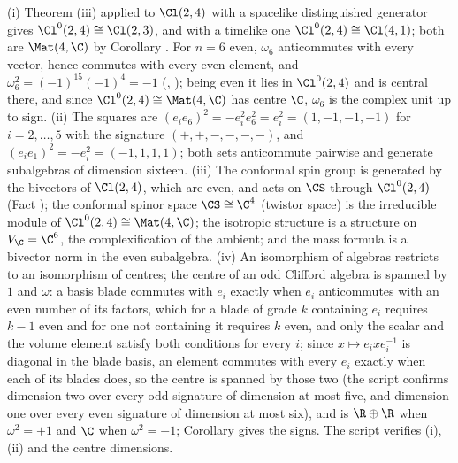 (i) Theorem (iii) applied to $\Cl(2,4)$ with a spacelike distinguished generator gives $\Cl^{0}(2,4) \cong \Cl(2,3)$, and with a timelike one $\Cl^{0}(2,4) \cong \Cl(4,1)$; both are $\Mat(4,\C)$ by Corollary . For $n = 6$ even, $\omega_{6}$ anticommutes with every vector, hence commutes with every even element, and $\omega_{6}^{2} = (-1)^{15}(-1)^{4} = -1$ (, ); being even it lies in $\Cl^{0}(2,4)$ and is central there, and since $\Cl^{0}(2,4) \cong \Mat(4,\C)$ has centre $\C$, $\omega_{6}$ is the complex unit up to sign. (ii) The squares are $(e_{i}e_{6})^{2} = -e_{i}^{2}e_{6}^{2} = e_{i}^{2} = (1, -1, -1, -1)$ for $i = 2, \ldots, 5$ with the signature $(+,+,-,-,-,-)$, and $(e_{i}e_{1})^{2} = -e_{i}^{2} = (-1, 1, 1, 1)$; both sets anticommute pairwise and generate subalgebras of dimension sixteen. (iii) The conformal spin group is generated by the bivectors of $\Cl(2,4)$, which are even, and acts on $\CS$ through $\Cl^{0}(2,4)$ (Fact ); the conformal spinor space $\CS \cong \C^{4}$ (twistor space) is the irreducible module of $\Cl^{0}(2,4) \cong \Mat(4,\C)$; the isotropic structure is a structure on $V_{\C} = \C^{6}$, the complexification of the ambient; and the mass formula is a bivector norm in the even subalgebra. (iv) An isomorphism of algebras restricts to an isomorphism of centres; the centre of an odd Clifford algebra is spanned by $1$ and $\omega$: a basis blade commutes with $e_{i}$ exactly when $e_{i}$ anticommutes with an even number of its factors, which for a blade of grade $k$ containing $e_{i}$ requires $k - 1$ even and for one not containing it requires $k$ even, and only the scalar and the volume element satisfy both conditions for every $i$; since $x \mapsto e_{i}xe_{i}^{-1}$ is diagonal in the blade basis, an element commutes with every $e_{i}$ exactly when each of its blades does, so the centre is spanned by those two (the script confirms dimension two over every odd signature of dimension at most five, and dimension one over every even signature of dimension at most six), and is $\R \oplus \R$ when $\omega^{2} = +1$ and $\C$ when $\omega^{2} = -1$; Corollary  gives the signs. The script verifies (i), (ii) and the centre dimensions.
